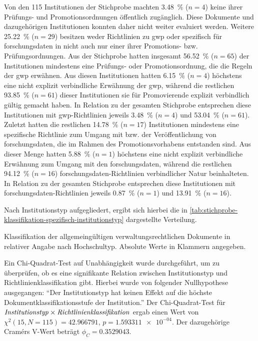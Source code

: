 Von den \num{115} Institutionen der Stichprobe machten \SI{3,48}{\percent} ($n=\num{4}$) keine ihrer Prüfungs- und Promotionsordnungen öffentlich zugänglich.
Diese Dokumente und dazugehörigen Institutionen konnten daher nicht weiter evaluiert werden.
Weitere \SI{25,22}{\percent} ($n=\num{29}$) besitzen weder Richtlinien zu \gls{gwp} oder spezifisch für \gls{forschungsdaten} in nicht auch nur einer ihrer Promotions- bzw. Prüfungsordnungen.
Aus der Stichprobe hatten insgesamt \SI{56,52}{\percent} ($n=\num{65}$) der Institutionen mindestens eine Prüfungs- oder Promotionsordnung, die die Regeln der \gls{gwp} erwähnen.
Aus diesen Institutionen hatten \SI{6,15}{\percent} ($n=\num{4}$) höchstens eine nicht explizit verbindliche Erwähnung der \gls{gwp}, während die restlichen \SI{93,85}{\percent} ($n=\num{61}$) dieser Institutionen sie für Promovierende explizit verbindlich gültig gemacht haben.
In Relation zu der gesamten Stichprobe entsprechen diese Institutionen mit \gls{gwp}-Richtlinien jeweils \SI{3,48}{\percent} ($n=\num{4}$) und \SI{53,04}{\percent} ($n=\num{61}$).
Zuletzt hatten die restlichen \SI{14,78}{\percent} ($n=\num{17}$) Institutionen mindestens eine spezifische Richtlinie zum Umgang mit bzw. der Veröffentlichung von \gls{forschungsdaten}, die im Rahmen des Promotionsvorhabens entstanden sind.
Aus dieser Menge hatten \SI{5,88}{\percent} ($n=\num{1}$) höchstens eine nicht explizit verbindliche Erwähnung zum Umgang mit den \gls{forschungsdaten}, während die restlichen \SI{94,12}{\percent} ($n=\num{16}$) \gls{forschungsdaten}-Richtlinien verbindlicher Natur beinhalteten.
In Relation zu der gesamten Stichprobe entsprechen diese Institutionen mit \gls{forschungsdaten}-Richtlinien jeweils \SI{0,87}{\percent} ($n=\num{1}$) und \SI{13,91}{\percent} ($n=\num{16}$).

Nach Institutionstyp aufgegliedert, ergibt sich hierbei die in \cref{tab:stichprobe-klassifikation-spezifisch-institutionstyp} dargestellte Verteilung.
\begin{table}[!htbp]
	\caption{Klassifikation der allgemeingültigen verwaltungsrechtlichen Dokumente in relativer Angabe nach Hochschultyp. Absolute Werte in Klammern angegeben.}
    
	\label{tab:stichprobe-klassifikation-spezifisch-institutionstyp}
\end{table}
Ein Chi-Quadrat-Test auf Unabhängigkeit wurde durchgeführt, um zu überprüfen, ob es eine signifikante Relation zwischen Institutionstyp und Richtlinienklassifikation gibt.
Hierbei wurde von folgender Nullhypothese ausgegangen:
\enquote{Der Institutionstyp hat keinen Effekt auf die höchste Dokumentklassifikationsstufe der Institution.}
Der Chi-Quadrat-Test für $\text{\textit{Institutionstyp}}\times\text{\textit{Richtlinienklassifikation}}$ ergab einen Wert von $\chi^2 (\num{15}, N = \num{115}) = \num[round-mode=places,round-precision=3]{42,966791}$, $p = \num[round-mode=places,round-precision=3]{1,593311e-04}$.
Der dazugehörige Cramérs V-Wert beträgt $\phi_C=\num[round-mode=places,round-precision=3]{0.3529043}$.

